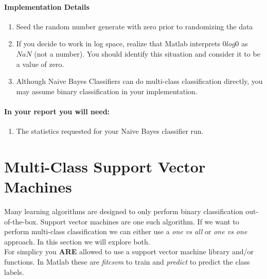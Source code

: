 \documentclass[12pt]{article}
\begin{document}
\paragraph{Implementation Details}
\begin{enumerate}
\item Seed the random number generate with zero prior to randomizing the data
\item If you decide to work in log space, realize that Matlab interprets $0log0$ as $NaN$ (not a number).  You should identify this situation and consider it to be a value of zero.
\item Although Naive Bayes Classifiers can do multi-class classification directly, you may assume binary classification in your implementation.
\end{enumerate}

\paragraph{In your report you will need:}
\begin{enumerate}
\item The statistics requested for your Naive Bayes classifier run.
\end{enumerate}

\newpage
\section{Multi-Class Support Vector Machines}\label{svm}
Many learning algorithms are designed to only perform binary classification out-of-the-box.  Support vector machines are one such algorithm.  If we want to perform multi-class classification we can either use a \emph{one vs all} or \emph{one vs one} approach.  In this section we will explore both.\\

\noindent
For simplicy you \textbf{ARE} allowed to use a support vector machine library and/or functions.  In Matlab these are \emph{fitcsvm} to train and \emph{predict} to predict the class labels.

\noindent
\end{document}
